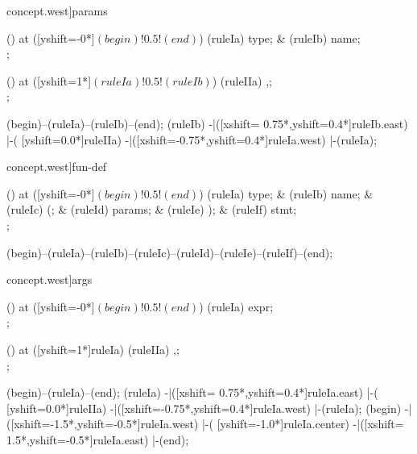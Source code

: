 \begin{syntax}[[xshift=20mm]concept.west]{params}
  
  \node[sequence,column sep=1.5cm] () at ([yshift=-0*\syntaxruledist]$(begin)!0.5!(end)$) {
    \node[nonterminal] (ruleIa) {type};
    &
    \node[terminal]    (ruleIb) {name};
    \\
  };
  
  \node[sequence,column sep=1.0cm] () at ([yshift=1*\syntaxruledist]$(ruleIa)!0.5!(ruleIb)$) {
    \node[terminal]    (ruleIIa) {,};
    \\
  };
  
  \draw[path] (begin)--(ruleIa)--(ruleIb)--(end);
  \draw[path] (ruleIb)
            -|([xshift= 0.75*\syntaxruledist,yshift=0.4*\syntaxruledist]ruleIb.east)
            |-(                            [yshift=0.0*\syntaxruledist]ruleIIa)
            -|([xshift=-0.75*\syntaxruledist,yshift=0.4*\syntaxruledist]ruleIa.west)
            |-(ruleIa);
\end{syntax}

\begin{syntax}[[xshift=20mm]concept.west]{fun-def}
  
  \node[sequence,column sep=1.2cm] () at ([yshift=-0*\syntaxruledist]$(begin)!0.5!(end)$) {
    \node[nonterminal] (ruleIa) {type};
    &
    \node[terminal]    (ruleIb) {name};
    &
    \node[terminal]    (ruleIc) {(};
    &
    \node[nonterminal] (ruleId) {params};
    &
    \node[terminal]    (ruleIe) {)};
    &
    \node[terminal]    (ruleIf) {stmt};
    \\
  };
  
  \draw[path] (begin)--(ruleIa)--(ruleIb)--(ruleIc)--(ruleId)--(ruleIe)--(ruleIf)--(end);
\end{syntax}

\begin{syntax}[[xshift=20mm]concept.west]{args}
  
  \node[sequence,column sep=1.5cm] () at ([yshift=-0*\syntaxruledist]$(begin)!0.5!(end)$) {
    \node[nonterminal] (ruleIa) {expr};
    \\
  };
  
  \node[sequence,column sep=1.0cm] () at ([yshift=1*\syntaxruledist]ruleIa) {
    \node[terminal]    (ruleIIa) {,};
    \\
  };
  
  \draw[path] (begin)--(ruleIa)--(end);
  \draw[path] (ruleIa)
            -|([xshift= 0.75*\syntaxruledist,yshift=0.4*\syntaxruledist]ruleIa.east)
            |-(                            [yshift=0.0*\syntaxruledist]ruleIIa)
            -|([xshift=-0.75*\syntaxruledist,yshift=0.4*\syntaxruledist]ruleIa.west)
            |-(ruleIa);
  \draw[path] (begin)
            -|([xshift=-1.5*\syntaxruledist,yshift=-0.5*\syntaxruledist]ruleIa.west)
            |-(                            [yshift=-1.0*\syntaxruledist]ruleIa.center)
            -|([xshift= 1.5*\syntaxruledist,yshift=-0.5*\syntaxruledist]ruleIa.east)
            |-(end);
\end{syntax}

